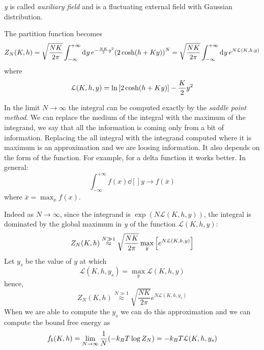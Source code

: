 \documentclass[../../Main/Main.tex]{subfiles}
\begin{document}
\begin{remark}
\emph{y} is called \emph{auxiliary field} and is a fluctuating external field  with Gaussian distribution.
\end{remark}
The partition function becomes
\begin{equation}
Z_N (K,h) = \sqrt{\frac{N K}{2 \pi }} \int_{- \infty }^{+ \infty } \dd[]{y} e^{- \frac{NK}{2}y^2} \qty(2 \cosh(h+Ky))^N = \sqrt{\frac{N K}{2 \pi }} \int_{-\infty }^{+\infty } \dd[]{y} e^{N \mathcal{L} (K,h,y)}
\end{equation}
where
\begin{equation}
  \mathcal{L} (K,h,y) = \ln{\qty[2 \cosh(h+Ky)] } - \frac{K}{2}y^2
\end{equation}

\begin{remark}
In the limit \( N \rightarrow \infty  \) the integral can be computed exactly by the \emph{saddle point method}.
We can replace the medium of the integral with the maximum of the integrand, we say that all the information is coming only from a bit of information. Replacing the all integral with the integrand computed where it is maximum is an approximation and we are loosing information.  It also depends on the form of the function. For example, for a delta function it works better. In general:
\begin{equation*}
  \int_{-\infty }^{+ \infty } f(x) \dd[]{y} \rightarrow f(\bar{x} )
\end{equation*}
where \( \bar{x} = \max_{x} f(x)  \).
\end{remark}


Indeed as \( N \rightarrow \infty  \), since the integrand is \( \exp (N \mathcal{L} (K,h,y))  \), the integral is dominated by the global maximum in \emph{y} of the function \( \mathcal{L} (K,h,y) \):
\begin{equation*}
  Z_N (K,h) \overset{N \gg1 }{\approx}  \sqrt{\frac{N K}{2 \pi }} \max_y \qty[e ^{N \mathcal{L}(K,h,y) } ]
\end{equation*}
Let \( y_s \) be the value of \( y \) at which
\begin{equation*}
  \mathcal{L} (K,h,y_s) = \max_y \mathcal{L} (K,h,y)
\end{equation*}
hence,
\begin{equation}
  Z_N (K,h) \overset{N \gg1 }{\approx} \sqrt{\frac{N K}{2 \pi }} e^{N \mathcal{L} (K,h,y_s)}
\end{equation}
When we are able to compute the \( y_s \) we can do this approximation and we can compute the bound free energy as 
\begin{equation}
  f_b (K,h)= \lim_{N \rightarrow \infty } \frac{1}{N} \qty(- k_B T \log{Z_N}) = -k_B T \mathcal{L} (K,h,y_s)
\end{equation}
\end{document}
